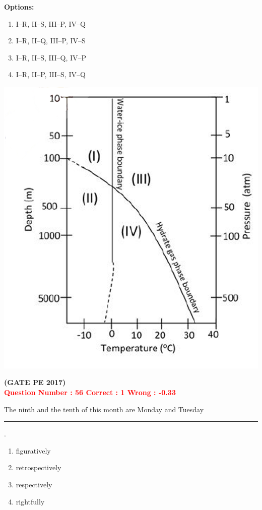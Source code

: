 \documentclass[journal,12pt,onecolumn]{article}
\begin{document}
{\begin{minipage}{0.58\textwidth}
\textbf{Options:}
\begin{enumerate}[label=(\Alph*)]
  \item I–R, II–S, III–P, IV–Q  
  \item I–R, II–Q, III–P, IV–S  
  \item I–R, II–S, III–Q, IV–P  
  \item I–R, II–P, III–S, IV–Q  
\end{enumerate}
\end{minipage}
\hfill
\begin{minipage}{0.4\textwidth}
\begin{flushright}
\includegraphics[width=\linewidth]{Figs/Graph_Q55.png} 

\end{flushright}
\end{minipage}

\hfill\textbf{(GATE PE 2017)}\\[0.6cm]

\textcolor{red}{\textbf{Question Number : 56 \hfill Correct : 1  Wrong : -0.33}}


The ninth and the tenth of this month are Monday and Tuesday \rule{2cm}{0.4pt}.

\begin{enumerate}[label=(\Alph*)]
    \item figuratively
    \item retrospectively
    \item respectively
    \item rightfully
\end{enumerate}

}
\end{document}
